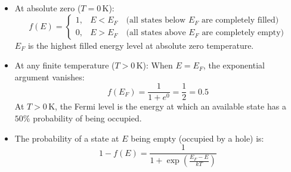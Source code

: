 \documentclass[12pt,a4paper]{article}
\begin{document}
\begin{tcolorbox}[defbox, title={\textbf{Physical Meaning and Properties of Fermi Level $E_F$}}]
\begin{itemize}[leftmargin=*, itemsep=3pt, topsep=0pt]
  \item At absolute zero ($T = 0\,\text{K}$):
    \begin{equation}
      f(E) = 
      \begin{cases} 
        1, & E < E_F \quad \text{(all states below $E_F$ are completely filled)} \\ 
        0, & E > E_F \quad \text{(all states above $E_F$ are completely empty)} 
      \end{cases}
    \end{equation}
    $E_F$ is the highest filled energy level at absolute zero temperature.
  \item At any finite temperature ($T > 0\,\text{K}$):
    When $E = E_F$, the exponential argument vanishes:
    \begin{equation}
      f(E_F) = \frac{1}{1 + e^0} = \frac{1}{2} = 0.5
    \end{equation}
    At $T>0\,\mathrm K$, the Fermi level is the energy at which an available state has a $50\%$ probability of being occupied.
  \item The probability of a state at $E$ being empty (occupied by a hole) is:
    \begin{equation}
      1 - f(E) = \frac{1}{1 + \exp\left(\displaystyle\frac{E_F - E}{k T}\right)}
    \end{equation}
\end{itemize}
\end{tcolorbox}
\end{document}
